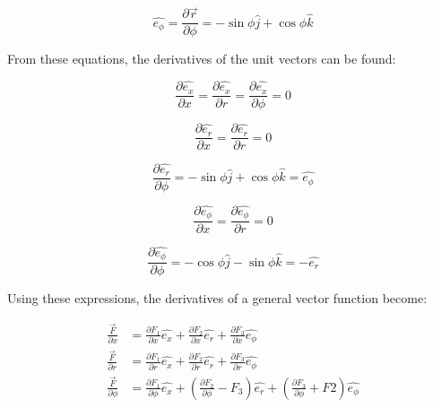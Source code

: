 \begin{equation}
  \hat{e_\phi} 
  = \frac{\partial\overrightarrow{r}}{\partial{\phi}} 
  = - \sin{\phi}\hat{j} + \cos{\phi}\hat{k}
\end{equation}

From these equations, the derivatives of the unit vectors can be found:

\begin{equation}
    \frac{\partial\hat{e_x}}{\partial x} 
  = \frac{\partial\hat{e_x}}{\partial r} 
  = \frac{\partial\hat{e_x}}{\partial\phi} = 0
\end{equation}

\begin{equation}
  \frac{\partial\hat{e_r}}{\partial x} = \frac{\partial\hat{e_r}}{\partial r} = 0
\end{equation}

\begin{equation}
  \frac{\partial\hat{e_r}}{\partial\phi} = 
  - \sin\phi\hat{j} 
  + \cos\phi\hat{k} = \hat{e_\phi}
\end{equation}

\begin{equation}
  \frac{\partial\hat{e_\phi}}{\partial x} = 
  \frac{\partial\hat{e_\phi}}{\partial r} = 0
\end{equation}

\begin{equation}
  \frac{\partial\hat{e_\phi}}{\partial\phi} = 
  - \cos\phi\hat{j} 
  - \sin\phi\hat{k} = 
  - \hat{e_r}
\end{equation}

Using these expressions, the derivatives of a general vector function become:

\begin{equation}
  \begin{aligned}
    \frac{\overrightarrow{F}}{\partial x} &= 
    \frac{\partial F_1}{\partial x}\hat{e_x} + 
    \frac{\partial F_2}{\partial x}\hat{e_r} + 
    \frac{\partial F_3}{\partial x}\hat{e_\phi} \\
    \frac{\overrightarrow{F}}{\partial r} &= 
    \frac{\partial F_1}{\partial r}\hat{e_x} + 
    \frac{\partial F_2}{\partial r}\hat{e_r} + 
    \frac{\partial F_3}{\partial r}\hat{e_\phi} \\
    \frac{\overrightarrow{F}}{\partial \phi} &= 
    \frac{\partial F_1}{\partial \phi}\hat{e_x} + 
    \left(\frac{\partial F_2}{\partial \phi} - F_3\right)\hat{e_r} + 
    \left(\frac{\partial F_3}{\partial \phi} + F2\right)\hat{e_\phi}
  \end{aligned}
\end{equation}

